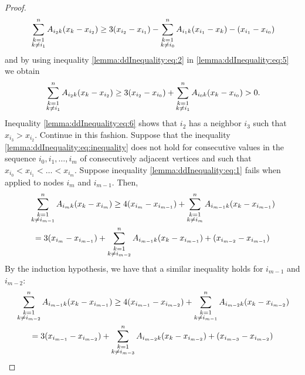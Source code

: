 \documentclass{article}
\theoremstyle{remark}
\begin{document}
\begin{proof}
	\begin{equation}{\label{lemma:ddInequality:eq:5}}
		\sum_{\substack{k=1\\k\neq i_1}}^nA_{i_2k}(x_k-x_{i_2}) \geq 3(x_{i_2}-x_{i_1}) - \sum_{\substack{k=1\\k\neq i_0}}^nA_{i_1k}(x_{i_1}-x_k)- (x_{i_1}-x_{i_0})
	\end{equation}
	and by using inequality \eqref{lemma:ddInequality:eq:2} in \eqref{lemma:ddInequality:eq:5} we obtain
	\begin{equation}{\label{lemma:ddInequality:eq:6}}
		\sum_{\substack{k=1\\k\neq i_1}}^nA_{i_2k}(x_k-x_{i_2}) \geq 3(x_{i_2}-x_{i_0}) + \sum_{\substack{k=1\\k\neq i_1}}^nA_{i_0k}(x_{k}-x_{i_0})>0.
	\end{equation}
	Inequality \eqref{lemma:ddInequality:eq:6} shows that $i_2$ has a neighbor $i_3$ such that $x_{i_3}>x_{i_2}$. Continue in this fashion. Suppose that the inequality \eqref{lemma:ddInequality:eq:inequality} does not hold for consecutive values in the sequence $i_0,i_1,\ldots,i_m$ of consecutively adjacent vertices and such that $x_{i_0}<x_{i_{1}}<\ldots<x_{i_m}$. Suppose inequality \eqref{lemma:ddInequality:eq:1} fails when applied to nodes $i_m$ and $i_{m-1}$. Then,
	\begin{multline}{\label{lemma:ddInequality:eq:7}}
		\sum_{\substack{k=1\\k\neq i_{m-1}}}^nA_{i_mk}(x_k-x_{i_m}) \geq 4(x_{i_m}-x_{i_{m-1}}) + \sum_{\substack{k=1\\k\neq i_{m}}}^n A_{i_{m-1}k}(x_k-x_{i_{m-1}}) \\= 3(x_{i_m}-x_{i_{m-1}}) + \sum_{\substack{k=1\\k\neq i_{m-2}}}^nA_{i_{m-1}k}(x_k-x_{i_{m-1}}) + (x_{i_{m-2}}-x_{i_{m-1}})
	\end{multline}
	By the induction hypothesis, we have that a similar inequality holds for $i_{m-1}$ and $i_{m-2}$:
	\begin{multline}{\label{lemma:ddInequality:eq:8}}
		\sum_{\substack{k=1\\k\neq i_{m-2}}}^nA_{i_{m-1}k}(x_k-x_{i_{m-1}}) \geq 4(x_{i_{m-1}}-x_{i_{m-2}}) + \sum_{\substack{k=1\\k\neq i_{m-1}}}^n A_{i_{m-2}k}(x_k-x_{i_{m-2}}) \\= 3(x_{i_{m-1}}-x_{i_{m-2}}) + \sum_{\substack{k=1\\k\neq i_{m-3}}}^nA_{i_{m-2}k}(x_k-x_{i_{m-2}}) + (x_{i_{m-3}}-x_{i_{m-2}})
	\end{multline}

\end{proof}
\end{document}
